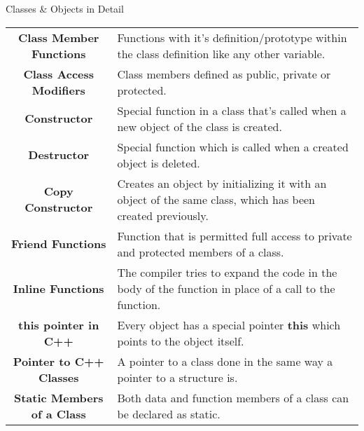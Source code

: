\documentclass[../lecture5-objectorientation.tex]{subfiles}
\begin{document}
\begin{frame}{Classes \& Objects in Detail}
    \begin{table}[h]
        \center
        \begin{tabularx}{\textwidth}{c X}
            \textbf{Class Member Functions} & Functions with it's definition/prototype within the class definition like any other variable. \\[0.5cm]
            \textbf{Class Access Modifiers} & Class members defined as public, private or protected. \\[0.5cm]
            \textbf{Constructor} & Special function in a class that's called when a new object of the class is created. \\[0.5cm]
            \textbf{Destructor} & Special function which is called when a created object is deleted. \\[0.5cm]
            \textbf{Copy Constructor} & Creates an object by initializing it with an object of the same class, which has been created previously. \\[0.5cm]
            \textbf{Friend Functions} & Function that is permitted full access to private and protected members of a class. \\[0.5cm]
            \textbf{Inline Functions} & The compiler tries to expand the code in the body of the function in place of a call to the function. \\[0.5cm]
            \textbf{this pointer in C++} & Every object has a special pointer \textbf{this} which points to the object itself. \\[0.5cm]
            \textbf{Pointer to C++ Classes} & A pointer to a class done in the same way a pointer to a structure is. \\[0.5cm]
            \textbf{Static Members of a Class} & Both data and function members of a class can be declared as static. \\
        \end{tabularx}
    \end{table}
\end{frame}

\end{document}
